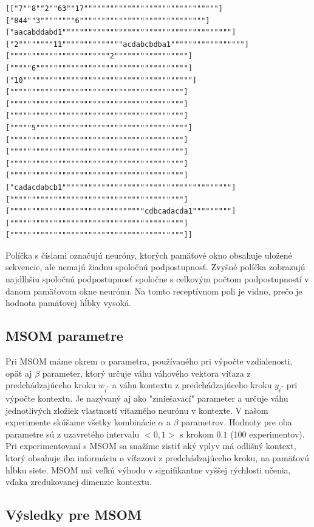 \begin{lstlisting}
[["7""8""2""63""17"""""""""""""""""""""""""""""""]
["844""3""""""""6"""""""""""""""""""""""""""""]
["aacabddabd1"""""""""""""""""""""""""""""""""""""""]
["2""""""""11""""""""""""""acdabcbdba1"""""""""""""""""]
["""""""""""""""""""""""2"""""""""""""""""]
["""""6"""""""""""""""""""""""""""""""""""]
["10"""""""""""""""""""""""""""""""""""""""]
[""""""""""""""""""""""""""""""""""""""""]
[""""""""""""""""""""""""""""""""""""""""]
[""""""""""""""""""""""""""""""""""""""""]
["""""5"""""""""""""""""""""""""""""""""""]
[""""""""""""""""""""""""""""""""""""""""]
[""""""""""""""""""""""""""""""""""""""""]
[""""""""""""""""""""""""""""""""""""""""]
[""""""""""""""""""""""""""""""""""""""""]
["cadacdabcb1"""""""""""""""""""""""""""""""""""""""]
[""""""""""""""""""""""""""""""""""""""""]
["""""""""""""""""""""""""""""""cdbcadacda1"""""""""]
[""""""""""""""""""""""""""""""""""""""""]
[""""""""""""""""""""""""""""""""""""""""]]
\end{lstlisting}

Políčka s číslami označujú neuróny, ktorých pamäťové okno obsahuje uložené sekvencie, ale nemajú žiadnu 
spoločnú podpostupnosť.
Zvyšné políčka zobrazujú najdlhšiu spoločnú podpostupnosť spoločne s celkovým počtom podpostupností 
v danom pamäťovom okne neurónu. Na tomto receptívnom poli je vidno, prečo je hodnota pamäťovej hĺbky vysoká.



\subsection{MSOM parametre}
Pri MSOM máme okrem $\alpha$ parametra, používaného pri výpočte vzdialenosti, opäť aj $\beta$ parameter, ktorý určuje váhu
váhového vektora víťaza z predchádzajúceho kroku $w_{i^{*}}$ a váhu kontextu
z predchádzajúceho kroku $y_{i^{*}}$ pri výpočte kontextu. Je nazývaný aj ako "zmiešavací" parameter
a určuje váhu jednotlivých zložiek vlastností víťazného neurónu v kontexte.
V našom experimente skúšame všetky kombinácie $\alpha$ a $\beta$ parametrov.
Hodnoty pre oba parametre sú z uzavretého intervalu $<0, 1>$ s krokom $0.1$ (100 experimentov).
Pri experimentovaní s MSOM sa snažíme zistiť aký vplyv má odlišný kontext, ktorý obsahuje iba informáciu
o víťazovi z predchádzajúceho kroku, na pamäťovú hĺbku siete. MSOM má veľkú výhodu v signifikantne 
vyššej rýchlosti učenia, vďaka zredukovanej dimenzie kontextu.

\subsection{Výsledky pre MSOM}

